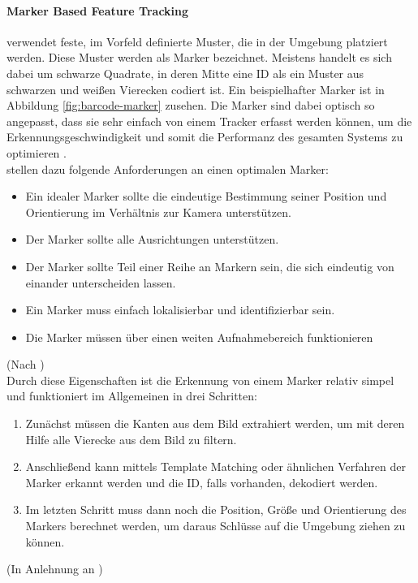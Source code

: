 \paragraph{Marker Based Feature Tracking} verwendet feste, im Vorfeld definierte Muster, die in der Umgebung platziert werden. Diese Muster werden als Marker bezeichnet. Meistens handelt es sich dabei um schwarze Quadrate, in deren Mitte eine ID als ein Muster aus schwarzen und weißen Vierecken codiert ist. Ein beispielhafter Marker ist in Abbildung \ref{fig:barcode-marker} zusehen.
Die Marker sind dabei optisch so angepasst, dass sie sehr einfach von einem Tracker erfasst werden können, um die Erkennungsgeschwindigkeit und somit die Performanz des gesamten Systems zu optimieren \citep[S. 28]{mehler-bicher:augmented-reality}.\\
\citeauthor{owen:fiducial-marker} stellen dazu folgende Anforderungen an einen optimalen Marker:
\begin{itemize}
\item Ein idealer Marker sollte die eindeutige Bestimmung seiner Position und Orientierung im Verhältnis zur Kamera unterstützen.
\item Der Marker sollte alle Ausrichtungen unterstützen.
\item Der Marker sollte Teil einer Reihe an Markern sein, die sich eindeutig von einander unterscheiden lassen.
\item Ein Marker muss einfach lokalisierbar und identifizierbar sein.
\item Die Marker müssen über einen weiten Aufnahmebereich funktionieren
\end{itemize}
(Nach \citet[S. 2]{owen:fiducial-marker})\\
Durch diese Eigenschaften ist die Erkennung von einem Marker relativ simpel und funktioniert im Allgemeinen in drei Schritten:
\begin{enumerate}
\item Zunächst müssen die Kanten aus dem Bild extrahiert werden, um mit deren Hilfe alle Vierecke aus dem Bild zu filtern.
\item Anschließend kann mittels Template Matching oder ähnlichen Verfahren der Marker erkannt werden und die ID, falls vorhanden, dekodiert werden.
\item Im letzten Schritt muss dann noch die Position, Größe und Orientierung des Markers berechnet werden, um daraus Schlüsse auf die Umgebung ziehen zu können.
\end{enumerate}
(In Anlehnung an \citet{cukovic:marker-vs-natural})

